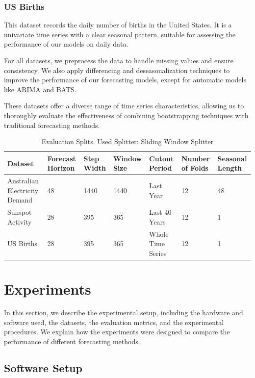 \subsubsection{US Births}
This dataset records the daily number of births in the United States. It is a univariate time series with a clear seasonal pattern, suitable for assessing the performance of our models on daily data.

For all datasets, we preprocess the data to handle missing values and ensure consistency. We also apply differencing and deseasonalization techniques to improve the performance of our forecasting models, except for automatic models like ARIMA and BATS.

These datasets offer a diverse range of time series characteristics, allowing us to thoroughly evaluate the effectiveness of combining bootstrapping techniques with traditional forecasting methods.

\begin{table}[h]
    \centering
    \footnotesize

    \caption{Evaluation Splits. Used Splitter: Sliding Window Splitter}
    \label{tab:evaluation_splits}
    \begin{tabularx}{\textwidth}{X|X|X|X|X|X|X}
         \toprule
        Dataset & Forecast Horizon & Step Width & Window Size & Cutout Period & Number of Folds & Seasonal Length \\ \midrule
        Australian Electricity Demand & 48 & 1440 & 1440 & Last Year & 12 & 48 \\ 
        Sunspot Activity & 28 & 395 & 365 & Last 40 Years & 12 & 1\\
        US Births & 28 & 395 & 365 & Whole Time Series & 12 & 1 \\
        \bottomrule
    \end{tabularx}
\end{table}

\section{Experiments} \label{experiments}
In this section, we describe the experimental setup, including the hardware and software used, the datasets, the evaluation metrics, and the experimental procedures. We explain how the experiments were designed to compare the performance of different forecasting methods.



\subsection{Software Setup}

